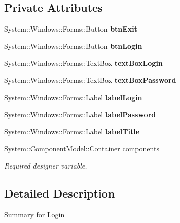 \subsection*{Private Attributes}
\begin{DoxyCompactItemize}
\item 
\hypertarget{class_magazyn_1_1_login_adc89cc4a8bc3cacc4641ee99dd9addf8}{}\label{class_magazyn_1_1_login_adc89cc4a8bc3cacc4641ee99dd9addf8} 
System\+::\+Windows\+::\+Forms\+::\+Button {\bfseries btn\+Exit}
\item 
\hypertarget{class_magazyn_1_1_login_af7e6d68cdca548aaa1c34d0c5bdfa1b3}{}\label{class_magazyn_1_1_login_af7e6d68cdca548aaa1c34d0c5bdfa1b3} 
System\+::\+Windows\+::\+Forms\+::\+Button {\bfseries btn\+Login}
\item 
\hypertarget{class_magazyn_1_1_login_ab59428ff5c6bb8f811319492fb75c54a}{}\label{class_magazyn_1_1_login_ab59428ff5c6bb8f811319492fb75c54a} 
System\+::\+Windows\+::\+Forms\+::\+Text\+Box {\bfseries text\+Box\+Login}
\item 
\hypertarget{class_magazyn_1_1_login_a92053b5ae166b6d90f51d34cbc555574}{}\label{class_magazyn_1_1_login_a92053b5ae166b6d90f51d34cbc555574} 
System\+::\+Windows\+::\+Forms\+::\+Text\+Box {\bfseries text\+Box\+Password}
\item 
\hypertarget{class_magazyn_1_1_login_adb1872ac48717852b57a433661a7bf95}{}\label{class_magazyn_1_1_login_adb1872ac48717852b57a433661a7bf95} 
System\+::\+Windows\+::\+Forms\+::\+Label {\bfseries label\+Login}
\item 
\hypertarget{class_magazyn_1_1_login_a131f47ddc0a64ea34666db00455b9faa}{}\label{class_magazyn_1_1_login_a131f47ddc0a64ea34666db00455b9faa} 
System\+::\+Windows\+::\+Forms\+::\+Label {\bfseries label\+Password}
\item 
\hypertarget{class_magazyn_1_1_login_a7967ac4de79a64c6313c7e43efba7d40}{}\label{class_magazyn_1_1_login_a7967ac4de79a64c6313c7e43efba7d40} 
System\+::\+Windows\+::\+Forms\+::\+Label {\bfseries label\+Title}
\item 
System\+::\+Component\+Model\+::\+Container \hyperlink{class_magazyn_1_1_login_a2457e69b73940be27550fcfe3a8040c8}{components}
\begin{DoxyCompactList}\small\item\em Required designer variable. \end{DoxyCompactList}\end{DoxyCompactItemize}


\subsection{Detailed Description}
Summary for \hyperlink{class_magazyn_1_1_login}{Login} 



